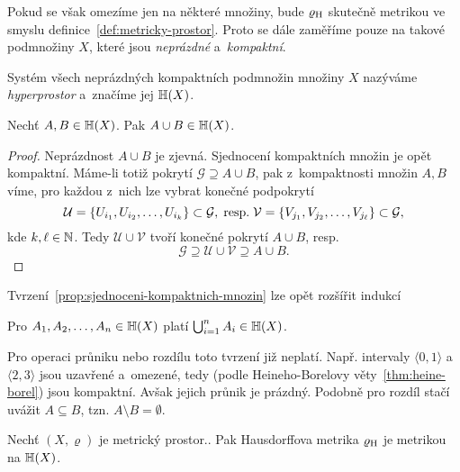 Pokud se však omezíme jen na některé množiny, bude $\varrho_\textup{H}$ skutečně metrikou ve smyslu definice~\ref{def:metricky-prostor}. Proto se dále zaměříme pouze na takové podmnožiny $X$, které jsou \emph{neprázdné} a~\emph{kompaktní}.
\begin{definition}[Hyperprostor]\label{def:hyperprostor}
    Systém všech neprázdných kompaktních podmnožin množiny $X$ nazýváme \emph{hyperprostor} a~značíme jej $\mathbb{H}(X)$.
\end{definition}
\begin{proposition}\label{prop:sjednoceni-kompaktnich-mnozin}
    Nechť $A,B\in\mathbb{H}(X)$. Pak $A\cup B\in\mathbb{H}(X)$.
\end{proposition}
\begin{proof}
    Neprázdnost $A\cup B$ je zjevná. Sjednocení kompaktních množin je opět kompaktní. Máme-li totiž pokrytí $\mathcal{G}\supseteq A\cup B$, pak z~kompaktnosti množin $A,B$ víme, pro každou z~nich lze vybrat konečné podpokrytí
    \[\mathcal{U}=\left\{U_{i_1},U_{i_2},\ldots,U_{i_k}\right\}\subset\mathcal{G},\;\text{resp.}\;\mathcal{V}=\left\{V_{j_1},V_{j_2},\ldots,V_{j_\ell}\right\}\subset\mathcal{G},\]
    kde $k,\ell\in\mathbb{N}$. Tedy $\mathcal{U}\cup\mathcal{V}$ tvoří konečné pokrytí $A\cup B$, resp.
    \[\mathcal{G}\supseteq\mathcal{U}\cup\mathcal{V}\supseteq A\cup B.\]
\end{proof}
Tvrzení~\ref{prop:sjednoceni-kompaktnich-mnozin} lze opět rozšířit indukcí
\begin{corollary}\label{cor:sjednoceni-n-kompaktnich-mnozin}
    Pro $A_1,A_2,\ldots,A_n\in\mathbb{H}(X)$ platí $\bigcup_{i=1}^n A_i\in\mathbb{H}(X)$.
\end{corollary}
Pro operaci průniku nebo rozdílu toto tvrzení již neplatí. Např. intervaly $\langle0,1\rangle$ a~$\langle2,3\rangle$ jsou uzavřené a~omezené, tedy (podle Heineho-Borelovy věty~\ref{thm:heine-borel}) jsou kompaktní. Avšak jejich průnik je prázdný. Podobně pro rozdíl stačí uvážit $A\subseteq B$, tzn. $A\setminus B=\emptyset$.
\begin{theorem}\label{thm:hausdorffova-metrika-je-metrika}
    Nechť $(X,\varrho)$ je metrický prostor.. Pak Hausdorffova metrika $\varrho_\textup{H}$ je metrikou na $\mathbb{H}(X)$.
\end{theorem}
